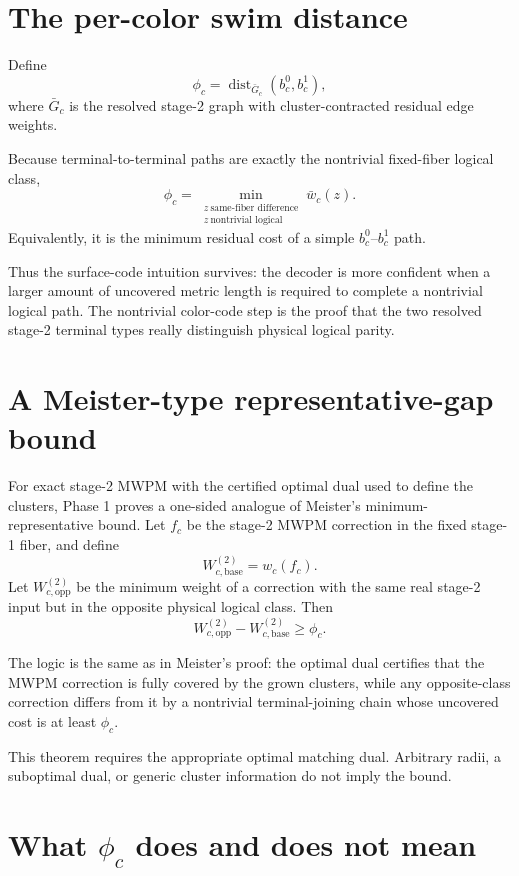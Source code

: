 \documentclass[11pt]{article}
\newcommand{\dist}{\operatorname{dist}}
\begin{document}
\section{The per-color swim distance}

Define
\[
  \boxed{
  \phi_c=\dist_{\bar G_c}(b_c^0,b_c^1),
  }
\]
where $\bar G_c$ is the resolved stage-2 graph with cluster-contracted
residual edge weights.

Because terminal-to-terminal paths are exactly the nontrivial fixed-fiber
logical class,
\[
  \phi_c
  =
  \min_{\substack{
       z\ \text{same-fiber difference}\\
       z\ \text{nontrivial logical}}}
       \bar w_c(z).
\]
Equivalently, it is the minimum residual cost of a simple
$b_c^0$--$b_c^1$ path.

Thus the surface-code intuition survives: the decoder is more confident when
a larger amount of uncovered metric length is required to complete a
nontrivial logical path. The nontrivial color-code step is the proof that the
two resolved stage-2 terminal types really distinguish physical logical
parity.

\section{A Meister-type representative-gap bound}

For exact stage-2 MWPM with the certified optimal dual used to define the
clusters, Phase 1 proves a one-sided analogue of Meister's
minimum-representative bound. Let $f_c$ be the stage-2 MWPM correction in the
fixed stage-1 fiber, and define
\[
  W_{c,\mathrm{base}}^{(2)}=w_c(f_c).
\]
Let $W_{c,\mathrm{opp}}^{(2)}$ be the minimum weight of a correction with the
same real stage-2 input but in the opposite physical logical class. Then
\[
  \boxed{
  W_{c,\mathrm{opp}}^{(2)}-W_{c,\mathrm{base}}^{(2)}\ge\phi_c.
  }
\]

The logic is the same as in Meister's proof: the optimal dual certifies that
the MWPM correction is fully covered by the grown clusters, while any
opposite-class correction differs from it by a nontrivial terminal-joining
chain whose uncovered cost is at least $\phi_c$.

This theorem requires the appropriate optimal matching dual. Arbitrary radii,
a suboptimal dual, or generic cluster information do not imply the bound.

\section{What $\phi_c$ does and does not mean}
\end{document}
